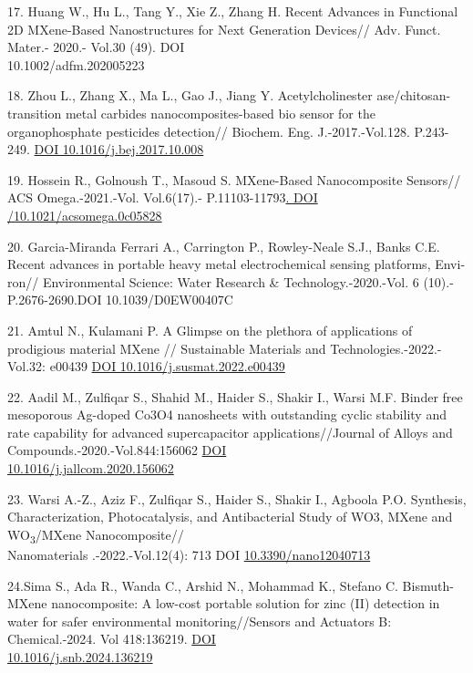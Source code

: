 \begin{references}
17. Huang W., Hu L., Tang Y., Xie Z., Zhang H. Recent Advances in
Functional 2D MXene-Based Nanostructures for Next Generation
Devices// Adv. Funct. Mater.- 2020.- Vol.30 (49).
DOI \\10.1002/adfm.202005223

18. Zhou L., Zhang X., Ma L., Gao J., Jiang Y. Acetylcholinester
ase/chitosan-transition metal carbides nanocomposites-based bio
sensor for the organophosphate pesticides detection// Biochem.
Eng. J.-2017.-Vol.128. P.243-249.
\href{https://doi.org/10.1016/j.bej.2017.10.008}{DOI
10.1016/j.bej.2017.10.008}

19. Hossein R., Golnoush T., Masoud S. MXene-Based Nanocomposite
Sensors// ACS Omega.-2021.-Vol. Vol.6(17).-
P.11103-11793\href{https://pubs.acs.org/doi/10.1021/acsomega.0c05828}{.
DOI /10.1021/acsomega.0c05828}

20. Garcia-Miranda Ferrari A., Carrington P., Rowley-Neale S.J.,
Banks C.E. Recent advances in portable heavy metal
electrochemical sensing platforms, Envi- ron// Environmental
Science: Water Research \& Technology.-2020.-Vol. 6 (10).-
P.2676-2690.DOI 10.1039/D0EW00407C

21. Amtul N., Kulamani P. A Glimpse on the plethora of
applications of prodigious material MXene // Sustainable Materials
and Technologies.-2022.-Vol.32: e00439
\href{https://doi.org/10.1016/j.susmat.2022.e00439}{DOI
10.1016/j.susmat.2022.e00439}

22. Aadil M., Zulfiqar S., Shahid M., Haider S., Shakir I.,
Warsi M.F. Binder free mesoporous Ag-doped Co3O4 nanosheets with
outstanding cyclic stability and rate capability for advanced
supercapacitor applications//Journal of Alloys and
Compounds.-2020.-Vol.844:156062
\href{https://doi.org/10.1016/j.jallcom.2020.156062}{DOI\\
10.1016/j.jallcom.2020.156062}

23. Warsi A.-Z., Aziz F., Zulfiqar S., Haider S., Shakir I.,
Agboola P.O. Synthesis, Characterization, Photocatalysis, and
Antibacterial Study of WO3, MXene and WO\textsubscript{3}/MXene
Nanocomposite//\\ Nanomaterials .-2022.-Vol.12(4): 713 DOI
\href{http://dx.doi.org/10.3390/nano12040713}{10.3390/nano12040713}

24.Sima S., Ada R., Wanda C., Arshid N., Mohammad K., Stefano C.
Bismuth-MXene nanocomposite: A low-cost portable solution for
zinc (II) detection in water for safer environmental
monitoring//Sensors and Actuators B: Chemical.-2024. Vol
418:136219.
\href{https://doi.org/10.1016/j.snb.2024.136219}{DOI\\
10.1016/j.snb.2024.136219}


\end{references}
